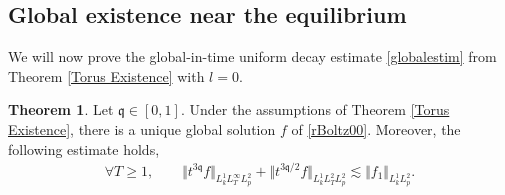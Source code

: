 \documentclass[reqno]{amsart}
\newcommand{\pv}{p}
\def\norm#1{\big\Vert#1\big\Vert}
\newcommand{\qq}{\mathfrak{q}}
\newcommand{\tTq}{t^{3\qq}}
\theoremstyle{definition}
\newtheorem{theorem}{Theorem}
\numberwithin{equation}{section}
\numberwithin{theorem}{section}
\begin{document}
    


\subsection{Global existence near the equilibrium}\label{subsglbalexistence}

We will now prove the global-in-time uniform decay estimate \eqref{globalestim} from Theorem \ref{Torus Existence} with $l=0$. 

\begin{theorem}
    Let \(\qq\in [0,1]\). Under the assumptions of Theorem \ref{Torus Existence}, there is a unique global solution \(f\) of \eqref{rBoltz00}. Moreover, the following estimate holds,
    \begin{align}\label{uniform.global}
\forall T\geq 1,\qquad     {\Vert{\tTq f}\Vert_{L^1_kL^\infty_TL^2_{\pv}}}
+
{\norm{t^{3\qq/2} f}_{L^1_kL^2_TL^2_{\pv}}}
\lesssim 
\norm{ {f}_1}_{L^1_kL^2_{\pv}}.
\end{align}
\end{theorem}
\end{document}
